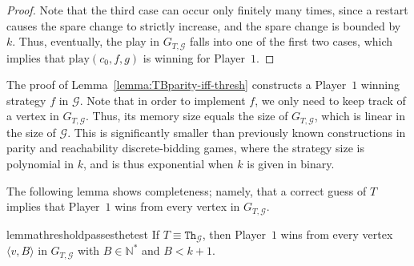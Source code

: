 \documentclass{theoretics}
\newcommand{\PO}{Player~$1$\xspace}
\newcommand{\G}{{\mathcal G}}
\newcommand{\Natstr}{\mathbb{N}^*}
\newcommand{\thresh}{\texttt{Th}\xspace}
\newcommand{\play}{\text{play}\xspace}
\newcommand{\zug}[1]{\langle #1  \rangle}
\begin{document}
\begin{proof}
	Note that the third case can occur only finitely many times, since a restart causes the spare change to strictly increase, and the spare change is bounded by $k$. Thus, eventually, the play in $G_{T, \G}$ falls into one of the first two cases, which implies that $\play(c_0, f, g)$ is winning for \PO. 	
\end{proof}

\begin{remark}
The proof of Lemma~\ref{lemma:TBparity-iff-thresh} constructs a \PO winning strategy $f$ in $\G$. Note that in order to implement $f$, we only need to keep track of a vertex in $G_{T, \G}$. Thus, its memory size equals the size of $G_{T, \G}$, which is linear in the size of $\G$. This is significantly smaller than previously known constructions in parity and reachability discrete-bidding games, where the strategy size is polynomial in $k$, and is thus exponential when $k$ is given in binary.
\end{remark}

The following lemma shows completeness; namely, that a correct guess of $T$ implies that \PO wins from every vertex in $G_{T, \G}$. 

\begin{restatable}{lemma}{thresholdpassesthetest}
	\label{lemma:thresholdpassesthetest}
	If $T \equiv \thresh_\G$, then \PO wins from every vertex $\zug{v, B}$ in $G_{T,\G}$ with $B \in \Natstr$ and $B < k+1$. 
\end{restatable}
\end{document}
